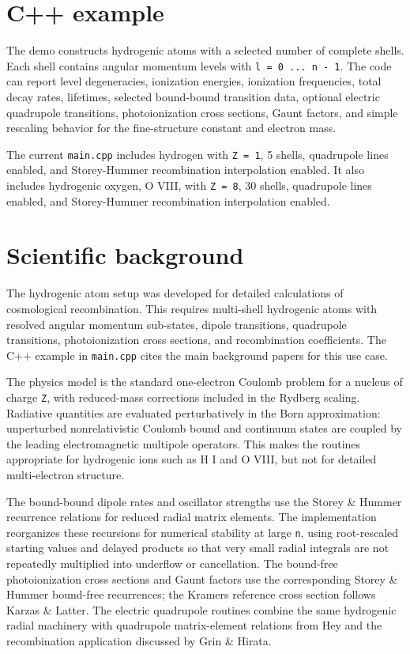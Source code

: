 \documentclass[11pt]{article}
\begin{document}
\section{C++ example}

The demo constructs hydrogenic atoms with a selected number of complete shells. Each shell contains angular momentum levels with \texttt{l = 0 ... n - 1}. The code can report level degeneracies, ionization energies, ionization frequencies, total decay rates, lifetimes, selected bound-bound transition data, optional electric quadrupole transitions, photoionization cross sections, Gaunt factors, and simple rescaling behavior for the fine-structure constant and electron mass.

The current \texttt{main.cpp} includes hydrogen with \texttt{Z = 1}, 5 shells, quadrupole lines enabled, and Storey-Hummer recombination interpolation enabled. It also includes hydrogenic oxygen, O VIII, with \texttt{Z = 8}, 30 shells, quadrupole lines enabled, and Storey-Hummer recombination interpolation enabled.

\section{Scientific background}

The hydrogenic atom setup was developed for detailed calculations of cosmological recombination. This requires multi-shell hydrogenic atoms with resolved angular momentum sub-states, dipole transitions, quadrupole transitions, photoionization cross sections, and recombination coefficients. The C++ example in \texttt{main.cpp} cites the main background papers for this use case.

The physics model is the standard one-electron Coulomb problem for a nucleus of charge \texttt{Z}, with reduced-mass corrections included in the Rydberg scaling. Radiative quantities are evaluated perturbatively in the Born approximation: unperturbed nonrelativistic Coulomb bound and continuum states are coupled by the leading electromagnetic multipole operators. This makes the routines appropriate for hydrogenic ions such as H I and O VIII, but not for detailed multi-electron structure.

The bound-bound dipole rates and oscillator strengths use the Storey \& Hummer recurrence relations for reduced radial matrix elements. The implementation reorganizes these recursions for numerical stability at large \texttt{n}, using root-rescaled starting values and delayed products so that very small radial integrals are not repeatedly multiplied into underflow or cancellation. The bound-free photoionization cross sections and Gaunt factors use the corresponding Storey \& Hummer bound-free recurrences; the Kramers reference cross section follows Karzas \& Latter. The electric quadrupole routines combine the same hydrogenic radial machinery with quadrupole matrix-element relations from Hey and the recombination application discussed by Grin \& Hirata.
\end{document}
